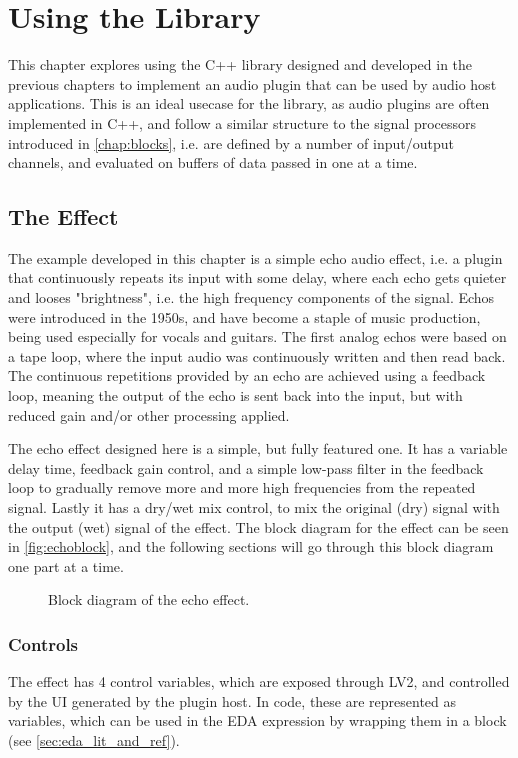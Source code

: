 \chapter{Using the Library}
\label{chap:echo}

This chapter explores using the C++ library designed and developed in the previous chapters to implement an
audio plugin that can be used by audio host applications. This is an ideal usecase for the library, as audio
plugins are often implemented in C++, and follow a similar structure to the signal processors introduced in
\autoref{chap:blocks}, i.e. are defined by a number of input/output channels, and evaluated on buffers of
data passed in one at a time.

\section{The Effect}

The example developed in this chapter is a simple echo audio effect, i.e. a plugin that continuously repeats
its input with some delay, where each echo gets quieter and looses "brightness", i.e. the high frequency
components of the signal. Echos were introduced in the 1950s, and have become a staple of music production,
being used especially for vocals and guitars. The first analog echos were based on a tape loop, where the
input audio was continuously written and then read back. The continuous repetitions provided by an echo are
achieved using a feedback loop, meaning the output of the echo is sent back into the input, but with reduced
gain and/or other processing applied.

The echo effect designed here is a simple, but fully featured one. It has a variable delay time, feedback
gain control, and a simple low-pass filter in the feedback loop to gradually remove more and more high
frequencies from the repeated signal. Lastly it has a dry/wet mix control, to mix the original (dry) signal
with the output (wet) signal of the effect. The block diagram for the effect can be seen in
\autoref{fig:echoblock}, and the following sections will go through this block diagram one part at a time.

\begin{figure}
  \centering
  
  \caption{Block diagram of the echo effect.}
  \label{fig:echoblock}
\end{figure}

\subsection{Controls}
The effect has 4 control variables, which are exposed through LV2, and controlled by the UI generated by the
plugin host. In code, these are represented as  variables, which can be used in the EDA
expression by wrapping them in a  block (see \autoref{sec:eda_lit_and_ref}).

